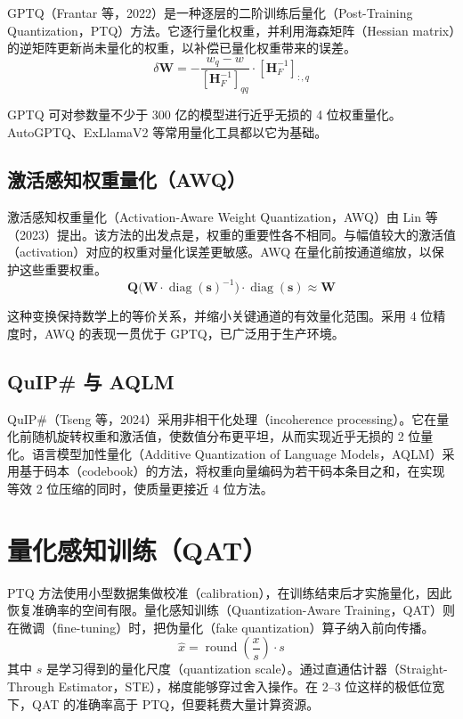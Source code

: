 GPTQ（Frantar 等，2022）是一种逐层的二阶训练后量化（Post-Training Quantization，PTQ）方法。它逐行量化权重，并利用海森矩阵（Hessian matrix）的逆矩阵更新尚未量化的权重，以补偿已量化权重带来的误差。
\[
\delta\mathbf{W}
=-\frac{w_q-w}{[\mathbf{H}_F^{-1}]_{qq}}\cdot[\mathbf{H}_F^{-1}]_{:,q}
\]

GPTQ 可对参数量不少于 300 亿的模型进行近乎无损的 4 位权重量化。AutoGPTQ、ExLlamaV2 等常用量化工具都以它为基础。

\subsection{激活感知权重量化（AWQ）}

激活感知权重量化（Activation-Aware Weight Quantization，AWQ）由 Lin 等（2023）提出。该方法的出发点是，权重的重要性各不相同。与幅值较大的激活值（activation）对应的权重对量化误差更敏感。AWQ 在量化前按通道缩放，以保护这些重要权重。
\[
\mathbf{Q}\bigl(\mathbf{W}\cdot\operatorname{diag}(\mathbf{s})^{-1}\bigr)
\cdot\operatorname{diag}(\mathbf{s})\approx\mathbf{W}
\]

这种变换保持数学上的等价关系，并缩小关键通道的有效量化范围。采用 4 位精度时，AWQ 的表现一贯优于 GPTQ，已广泛用于生产环境。

\subsection{QuIP\# 与 AQLM}

QuIP\#（Tseng 等，2024）采用非相干化处理（incoherence processing）。它在量化前随机旋转权重和激活值，使数值分布更平坦，从而实现近乎无损的 2 位量化。语言模型加性量化（Additive Quantization of Language Models，AQLM）采用基于码本（codebook）的方法，将权重向量编码为若干码本条目之和，在实现等效 2 位压缩的同时，使质量更接近 4 位方法。

\section{量化感知训练（QAT）}

PTQ 方法使用小型数据集做校准（calibration），在训练结束后才实施量化，因此恢复准确率的空间有限。量化感知训练（Quantization-Aware Training，QAT）则在微调（fine-tuning）时，把伪量化（fake quantization）算子纳入前向传播。
\[
\hat{x}=\operatorname{round}\!\left(\frac{x}{s}\right)\cdot s
\]
其中 $s$ 是学习得到的量化尺度（quantization scale）。通过直通估计器（Straight-Through Estimator，STE），梯度能够穿过舍入操作。在 2–3 位这样的极低位宽下，QAT 的准确率高于 PTQ，但要耗费大量计算资源。

